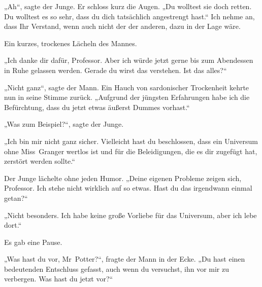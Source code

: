 „Ah“, sagte der Junge.
Er schloss kurz die Augen.
„Du wolltest sie doch retten. Du wolltest es so sehr, dass du dich tatsächlich angestrengt hast.“ Ich nehme an, dass Ihr Verstand, wenn auch nicht der der anderen, dazu in der Lage wäre.

Ein kurzes, trockenes Lächeln des Mannes.

„Ich danke dir dafür, Professor. Aber ich würde jetzt gerne bis zum Abendessen in Ruhe gelassen werden. Gerade du wirst das verstehen. Ist das alles?“

„Nicht ganz“, sagte der Mann.
Ein Hauch von sardonischer Trockenheit kehrte nun in seine Stimme zurück.
„Aufgrund der jüngsten Erfahrungen habe ich die Befürchtung, dass du jetzt etwas äußerst Dummes vorhast.“

„Was zum Beispiel?“, sagte der Junge.

„Ich bin mir nicht ganz sicher. Vielleicht hast du beschlossen, dass ein Universum ohne Miss~Granger wertlos ist und für die Beleidigungen, die es dir zugefügt hat, zerstört werden sollte.“

Der Junge lächelte ohne jeden Humor.
„Deine eigenen Probleme zeigen sich, Professor. Ich stehe nicht wirklich auf so etwas. Hast du das irgendwann einmal getan?“

„Nicht besonders. Ich habe keine große Vorliebe für das Universum, aber ich lebe dort.“

Es gab eine Pause.

„Was hast du vor, Mr~Potter?“, fragte der Mann in der Ecke. „Du hast einen bedeutenden Entschluss gefasst, auch wenn du versuchst, ihn vor mir zu verbergen. Was hast du jetzt vor?“

